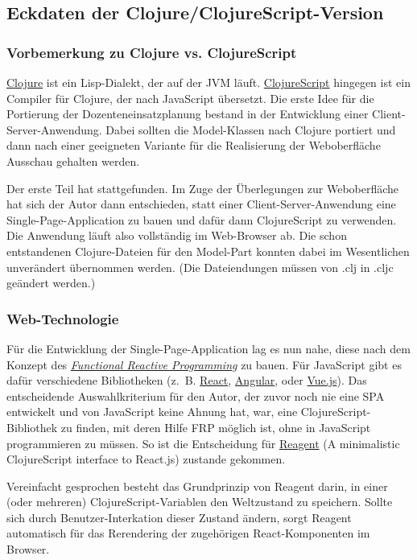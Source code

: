 \documentclass[11pt]{article}
\begin{document}
\subsection*{Eckdaten der Clojure/ClojureScript-Version}
\label{sec:orge31df31}
\subsubsection*{Vorbemerkung zu Clojure vs. ClojureScript}
\label{sec:org27de1e0}
\href{https://clojure.org}{Clojure} ist ein Lisp-Dialekt, der auf der JVM läuft. \href{https://clojurescript.org}{ClojureScript}
hingegen ist ein Compiler für Clojure, der nach JavaScript übersetzt.
Die erste Idee für die Portierung der Dozenteneinsatzplanung bestand
in der Entwicklung einer Client-Server-Anwendung. Dabei sollten die
Model-Klassen nach Clojure portiert und dann nach einer
geeigneten Variante für die Realisierung der Weboberfläche Ausschau
gehalten werden.

Der erste Teil hat stattgefunden. Im Zuge der Überlegungen zur
Weboberfläche hat sich der Autor dann entschieden, statt einer
Client-Server-Anwendung eine Single-Page-Application zu bauen und
dafür dann ClojureScript zu verwenden. Die Anwendung läuft also
vollständig im Web-Browser ab. Die schon entstandenen Clojure-Dateien
für den Model-Part konnten dabei im Wesentlichen unverändert übernommen
werden. (Die Dateiendungen müssen von .clj in .cljc geändert werden.)

\subsubsection*{Web-Technologie}
\label{sec:orgc6af341}
Für die Entwicklung der Single-Page-Application lag es nun nahe, diese
nach dem Konzept des \emph{\href{https://en.wikipedia.org/wiki/Functional\_reactive\_programming}{Functional Reactive Programming}} zu bauen. Für
JavaScript gibt es dafür verschiedene Bibliotheken (z.~B. \href{https://reactjs.org}{React},
\href{https://angular.io}{Angular}, oder \href{https://vuejs.org}{Vue.js}). Das entscheidende Auswahlkriterium für den
Autor, der zuvor noch nie eine SPA entwickelt und von JavaScript keine
Ahnung hat, war, eine ClojureScript-Bibliothek zu finden, mit deren Hilfe
FRP möglich ist, ohne in JavaScript programmieren zu müssen. So ist
die Entscheidung für \href{https://github.com/reagent-project/reagent}{Reagent} (A minimalistic ClojureScript interface
to React.js) zustande gekommen.

Vereinfacht gesprochen besteht das Grundprinzip von Reagent darin, in
einer (oder mehreren) ClojureScript-Variablen den Weltzustand zu
speichern. Sollte sich durch Benutzer-Interkation dieser Zustand
ändern, sorgt Reagent automatisch für das Rerendering der zugehörigen
React-Komponenten im Browser. 
\end{document}
